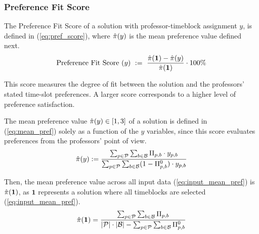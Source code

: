     
    \vspace{1em}
    \subsubsection{Preference Fit Score}

        The Preference Fit Score of a solution with professor-timeblock assignment $y$, is defined in (\ref{eq:pref_score}), where $\hat{\pi} (y)$ is the mean preference value defined next.
        \begin{equation}
            \text{Preference Fit Score } (y) \ := \ \frac{\hat{\pi} (\mathbf{1})-\hat{\pi} (y)}{\hat{\pi} (\mathbf{1})} \cdot 100\%
            \label{eq:pref_score}
        \end{equation}

        This score measures the degree of fit between the solution and the professors' stated time-slot preferences. A larger score corresponds to a higher level of preference satisfaction.

        The mean preference value $\hat{\pi} (y) \in [1,3]$ of a solution is defined in (\ref{eq:mean_pref}) solely as a function of the $y$ variables, since this score evaluates preferences from the professors' point of view.
        \begin{equation}
            \hat{\pi} (y) := \frac{\sum_{p\in\mathcal{P}}\sum_{b\in\mathcal{B}} \Pi_{p,b} \cdot y_{p,b}}{\sum_{p\in\mathcal{P}}\sum_{b\in\mathcal{B}} (1-\Pi^0_{p,b}) \cdot y_{p,b}}
            \label{eq:mean_pref}
        \end{equation}
        
        Then, the mean preference value across all input data (\ref{eq:input_mean_pref}) is $\hat{\pi} (\mathbf{1})$, as $\mathbf{1}$ represents a solution where all timeblocks are selected (\ref{eq:input_mean_pref}).
        \begin{equation}
            \hat{\pi} (\mathbf{1}) = \frac{\sum_{p\in\mathcal{P}}\sum_{b\in\mathcal{B}} \Pi_{p,b}}{|\mathcal{P}|\cdot|\mathcal{B}|-\sum_{p\in\mathcal{P}}\sum_{b\in\mathcal{B}} \Pi^0_{p,b}}
            \label{eq:input_mean_pref}
        \end{equation}

\vspace{1em}
